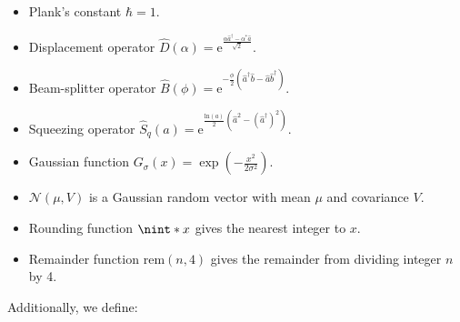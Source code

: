 \documentclass[prx,reprint,superscriptaddress,longbibliography,floatfix,nofootinbib]{revtex4-1}
\DeclarePairedDelimiter{\nint}\lfloor\rceil
\begin{document}
\begin{itemize}
\item Plank's constant $\hbar = 1$. 
\item Displacement operator $\hat{D}(\alpha) = \text{e}^{\frac{\alpha \hat{a}^{\dagger}-\alpha^{*} \hat{a}}{\sqrt{2}}}$.
\item Beam-splitter operator $\hat{B}(\phi) = \text{e}^{-\frac{\phi}{2}(\hat{a}^{\dagger}\hat{b}-\hat{a}\hat{b}^{\dagger})}$.
\item Squeezing operator $\hat{S}_{q}(a) = \text{e}^{\frac{\text{ln}(a)}{2}(\hat{a}^2-(\hat{a}^{\dagger})^2)}$.
\item Gaussian function $G_{\sigma}(x) = \exp(-\frac{x^2}{2 \sigma^2})$.
\item $\mathcal{N}(\mu,V)$ is a Gaussian random vector with mean $\mu$ and covariance $V$.
\item Rounding function $\nint*{x}$ gives the nearest integer to $x$.
\item Remainder function $\mathrm{rem}(n, 4)$ gives the remainder from dividing integer $n$ by 4.
\end{itemize}
Additionally, we define: 
\end{document}
